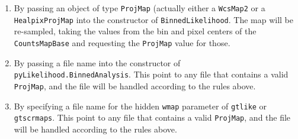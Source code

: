 \documentclass[preprint]{aastex}
\begin{document}
\begin{enumerate}
\item{By passing an object of type {\tt ProjMap} (actually either a
    {\tt WcsMap2} or a {\tt HealpixProjMap} into the constructor of
    {\tt BinnedLikelihood}.  The map will be re-sampled, taking the
    values from the bin and pixel centers of the {\tt CountsMapBase}
    and requesting the {\tt ProjMap} value for those.}
\item{By passing a file name into the constructor of {\tt
      pyLikelihood.BinnedAnalysis}.  This point to any file that
    contains a valid {\tt ProjMap}, and the file will be handled
    according to the rules above.}
\item{By specifying a file name for the hidden {\tt wmap} parameter of
    {\tt gtlike} or {\tt gtscrmaps}.  This point to any file that
    contains a valid {\tt ProjMap}, and the file will be handled
    according to the rules above.}
\end{enumerate}
\end{document}
